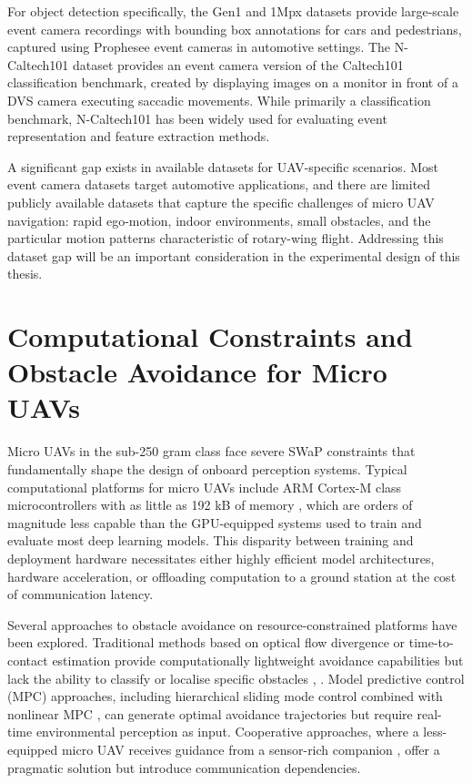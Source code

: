 \documentclass[11pt, a4paper]{report}
\begin{document}
For object detection specifically, the Gen1 and 1Mpx datasets \cite{perot2020learning} provide large-scale event camera recordings with bounding box annotations for cars and pedestrians, captured using Prophesee event cameras in automotive settings. The N-Caltech101 dataset \cite{orchard2015converting} provides an event camera version of the Caltech101 classification benchmark, created by displaying images on a monitor in front of a DVS camera executing saccadic movements. While primarily a classification benchmark, N-Caltech101 has been widely used for evaluating event representation and feature extraction methods. 

A significant gap exists in available datasets for UAV-specific scenarios. Most event camera datasets target automotive applications, and there are limited publicly available datasets that capture the specific challenges of micro UAV navigation: rapid ego-motion, indoor environments, small obstacles, and the particular motion patterns characteristic of rotary-wing flight. Addressing this dataset gap will be an important consideration in the experimental design of this thesis. 

\section{Computational Constraints and Obstacle Avoidance for Micro UAVs}
Micro UAVs in the sub-250 gram class face severe SWaP constraints that fundamentally shape the design of onboard perception systems. Typical computational platforms for micro UAVs include ARM Cortex-M class microcontrollers with as little as 192 kB of memory \cite{niculescu2022improving}, which are orders of magnitude less capable than the GPU-equipped systems used to train and evaluate most deep learning models. This disparity between training and deployment hardware necessitates either highly efficient model architectures, hardware acceleration, or offloading computation to a ground station at the cost of communication latency. 

Several approaches to obstacle avoidance on resource-constrained platforms have been explored. Traditional methods based on optical flow divergence or time-to-contact estimation provide computationally lightweight avoidance capabilities but lack the ability to classify or localise specific obstacles \cite{falanga2019fast}, \cite{decroon2016monocular}. Model predictive control (MPC) approaches, including hierarchical sliding mode control combined with nonlinear MPC \cite{chen2021hierarchical}, can generate optimal avoidance trajectories but require real-time environmental perception as input. Cooperative approaches, where a less-equipped micro UAV receives guidance from a sensor-rich companion \cite{petracek2024drones}, offer a pragmatic solution but introduce communication dependencies. 
\end{document}
